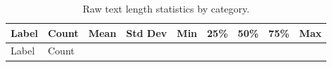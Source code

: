 \documentclass[
  titlepage]{article}
\begin{document}
\begin{longtable}[]{@{}
  >{\raggedright\arraybackslash}p{}
  >{\raggedright\arraybackslash}p{}
  >{\raggedright\arraybackslash}p{}
  >{\raggedright\arraybackslash}p{}
  >{\raggedright\arraybackslash}p{}
  >{\raggedright\arraybackslash}p{}
  >{\raggedright\arraybackslash}p{}
  >{\raggedright\arraybackslash}p{}
  >{\raggedright\arraybackslash}p{}@{}}
\caption{Raw text length statistics by category.}\tabularnewline
\toprule\noalign{}
\begin{minipage}[b]{\linewidth}\raggedright
Label
\end{minipage} & \begin{minipage}[b]{\linewidth}\raggedright
Count
\end{minipage} & \begin{minipage}[b]{\linewidth}\raggedright
Mean
\end{minipage} & \begin{minipage}[b]{\linewidth}\raggedright
Std Dev
\end{minipage} & \begin{minipage}[b]{\linewidth}\raggedright
Min
\end{minipage} & \begin{minipage}[b]{\linewidth}\raggedright
25\%
\end{minipage} & \begin{minipage}[b]{\linewidth}\raggedright
50\%
\end{minipage} & \begin{minipage}[b]{\linewidth}\raggedright
75\%
\end{minipage} & \begin{minipage}[b]{\linewidth}\raggedright
Max
\end{minipage} \\
\midrule\noalign{}
\endfirsthead
\toprule\noalign{}
\begin{minipage}[b]{\linewidth}\raggedright
Label
\end{minipage} & \begin{minipage}[b]{\linewidth}\raggedright
Count
\end{minipage} & \begin{minipage}[b]{\linewidth}\raggedright

\end{minipage}
\end{longtable}
\end{document}
